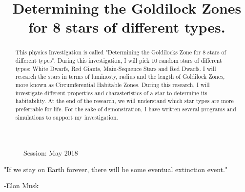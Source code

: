 \documentclass[a4paper,12pt]{article}
\title{Determining the Goldilock Zones for 8 stars of different types.}
\date{}
\author{}
\begin{document}
\maketitle
\tableofcontents

\begin{figure}
  \begin{flushleft}
    Session: May 2018\\
    \end{flushleft}
  \end{figure}

\newpage
{}
\doublespacing

\begin{center}
  "If we stay on Earth forever, there will be some eventual extinction event." 
  \end{center}
\begin{flushright}
  -Elon Musk \cite{musk}
\end{flushright}

\begin{abstract}
  This physics Investigation is called "Determining the Goldilocks Zone for 8 stars of different types".
  During this investigation, I will pick 10 random stars of different types: White Dwarfs, Red Giants, Main-Sequence Stars and Red Dwarfs.
  I will research the stars in terms of luminosty, radius and the length of Goldilock Zones, more known as Circumferential Habitable Zones.
  During this research, I will investigate different properties and charasteristics of a star to determine its habitability.
  At the end of the research, we will understand which star types are more preferrable for life.
  For the sake of demonstration, I have written several programs and simulations to support my investigation. 
  \end{abstract}
\end{document}
